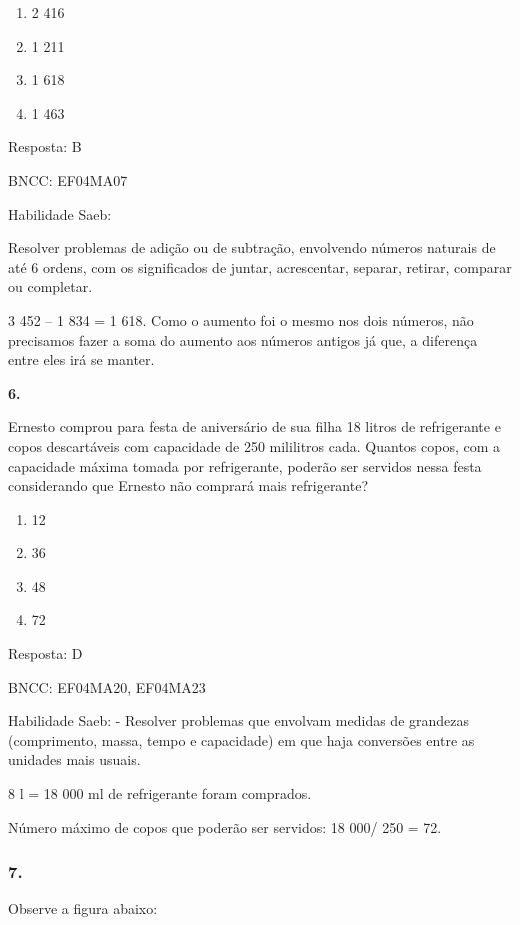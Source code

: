 \begin{enumerate}
\def\labelenumi{\alph{enumi})}
\item
  2 416
\item
  1 211
\item
  1 618
\item
  1 463
\end{enumerate}

Resposta: B

BNCC: EF04MA07

Habilidade Saeb:

Resolver problemas de adição ou de subtração, envolvendo números
naturais de até 6 ordens, com os significados de juntar, acrescentar,
separar, retirar, comparar ou completar.

3 452 -- 1 834 = 1 618. Como o aumento foi o mesmo nos dois números, não
precisamos fazer a soma do aumento aos números antigos já que, a
diferença entre eles irá se manter.

\textbf{6.}

Ernesto comprou para festa de aniversário de sua filha 18 litros de
refrigerante e copos descartáveis com capacidade de 250 mililitros cada.
Quantos copos, com a capacidade máxima tomada por refrigerante, poderão
ser servidos nessa festa considerando que Ernesto não comprará mais
refrigerante?

\begin{enumerate}
\def\labelenumi{\alph{enumi})}
\item
  12
\item
  36
\item
  48
\item
  72
\end{enumerate}

Resposta: D

BNCC: EF04MA20, EF04MA23

Habilidade Saeb: - Resolver problemas que envolvam medidas de grandezas
(comprimento, massa, tempo e capacidade) em que haja conversões entre as
unidades mais usuais.

8 l = 18 000 ml de refrigerante foram comprados.

Número máximo de copos que poderão ser servidos: 18 000/ 250 = 72.

\subsubsection{7.}\label{section-148}

Observe a figura abaixo:

